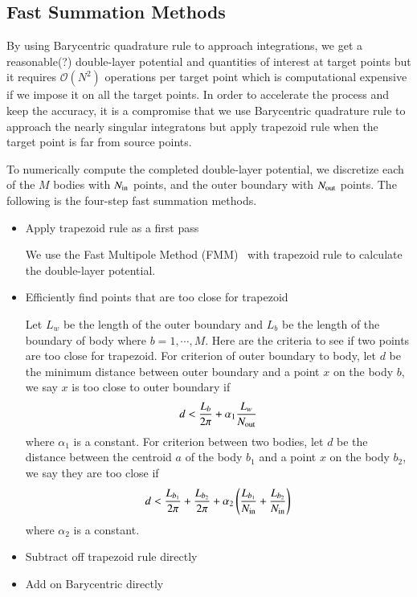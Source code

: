 \documentclass[preprint, 10pt]{elsarticle}
\begin{document}
\subsection{Fast Summation Methods}
\label{sec:fmm}

{\color{red}
By using Barycentric quadrature rule to approach integrations, we get a reasonable(?) double-layer potential and quantities of interest at target points but it requires $\mathcal{O}(N^2)$ operations per target point which is computational expensive if we impose it on all the target points. In order to accelerate the process and keep the accuracy, it is a compromise that we use Barycentric quadrature rule to approach the nearly singular integratons but apply trapezoid rule when the target point is far from source points. 


To numerically compute the completed double-layer potential, we discretize each of the $M$ bodies with  $N_{\mathrm{in}}$ points, and the outer boundary with $N_{\mathrm{out}}$ points. The following is the four-step fast summation methods.
}
\begin{itemize}
  \item Apply trapezoid rule as a first pass

{\color{red} We use the Fast Multipole Method (FMM)~\cite{gre-rok1987, gre-gre-may1992} with trapezoid rule to calculate the double-layer potential.
}
  \item Efficiently find points that are too close for trapezoid

{\color{red}
 Let $L_w$ be the length of the outer boundary and $L_{b}$ be the length of the boundary of body where $b=1, \cdots, M$. Here are the criteria to see if two points are too close for trapezoid. For criterion of outer boundary to body,  let $d$ be the minimum distance between outer boundary and a point $x$ on the body $b$, we say $x$ is too close to outer boundary if
\begin{equation}\label{eqn:Cw2b}
d<\frac{L_{b}}{2\pi} + \alpha_1\frac{L_w}{N_{\mathrm{out}}}
\end{equation}
where $\alpha_1$ is a constant. 
For criterion between two bodies, let $d$ be the distance between the centroid $a$ of the body $b_1$ and a point $x$ on the body $b_2$, we say they are too close if
\begin{equation}\label{eqn:Cb2b}
d<\frac{L_{b_1}}{2\pi}+\frac{L_{b_2}}{2\pi}+\alpha_2\left(\frac{L_{b_1}}{N_{\mathrm{in}}}+\frac{L_{b_2}}{N_{\mathrm{in}}}\right)
\end{equation}
where $\alpha_2$ is a constant. 

}
  \item Subtract off trapezoid rule directly
  \item Add on Barycentric directly
\end{itemize}
\end{document}
